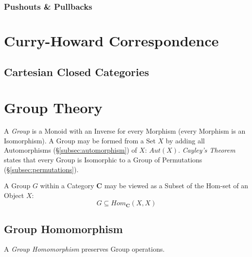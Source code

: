 \subsubsection{Pushouts \& Pullbacks}\label{subsec:category_pullback}

\section{Curry-Howard Correspondence}\label{sec:curry_howard}
\subsection{Cartesian Closed Categories}\label{subsec:cartesian_category}

\section{Group Theory}

A \emph{Group} is a Monoid with an Inverse for every Morphism (every
Morphism is an Isomorphism). A Group may be formed from a Set $X$ by
adding all Automorphisms (\S\ref{subsec:automorphism}) of $X$:
$Aut(X)$. \emph{Cayley's Theorem} states that every Group is
Isomorphic to a Group of Permutations (\S\ref{subsec:permutations}).

A Group $G$ within a Category $\mathbf{C}$ may be viewed as a Subset
of the Hom-set of an Object $X$:
\[
    G \subseteq Hom_{\mathbf{C}}(X,X)
\]

\subsection{Group Homomorphism}\label{subsec:group_homomorphism}

A \emph{Group Homomorphism} preserves Group operations.

